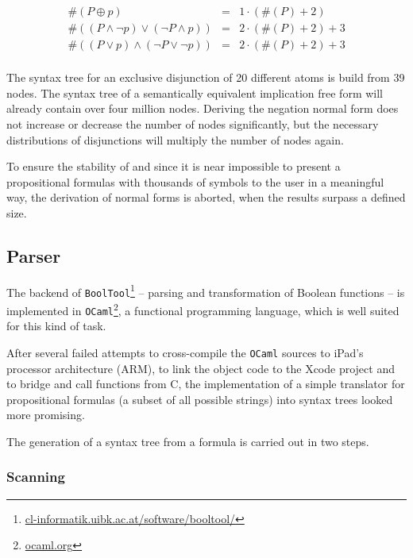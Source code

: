 \begin{eqnarray*}
\#(P \oplus p) & = & 1 \cdot(\#(P) + 2) \\
\#((P \wedge \neg p) \vee  (\neg P \wedge p)) & = & 2 \cdot (\#(P) + 2) + 3 \\
\#((P \vee p) \wedge  (\neg P \vee \neg p)) & = & 2 \cdot (\#(P) + 2) + 3 \\
\end{eqnarray*}

The syntax tree for an exclusive disjunction of 20 different atoms is build from 39 nodes.
The syntax tree of a semantically equivalent implication free form will already contain over four million nodes.
Deriving the negation normal form does not increase or decrease the number of nodes significantly,
but the necessary distributions of disjunctions will multiply the number of nodes again.

To ensure the stability of \Nyaya 
and since it is near impossible 
to present a propositional formulas with thousands of symbols 
to the user in a meaningful way, 
the derivation of normal forms is aborted, when the results surpass a defined size.



\subsection{Parser}
\label{subsec:Parser}

The backend of \verb+BoolTool+\footnote{
\href{http://cl-informatik.uibk.ac.at/software/booltool/}{cl-informatik.uibk.ac.at/software/booltool/}} 
– parsing and transformation of Boolean functions – 
is implemented in \verb+OCaml+\footnote{
\href{http://ocaml.org}{ocaml.org}}, 
a functional programming language, which is well suited for this kind of task.

After several failed attempts to cross-compile the \verb+OCaml+ sources to iPad's processor architecture (ARM),
to link the object code to the Xcode project and to bridge and call functions from C, 
the implementation of a simple translator 
for propositional formulas (a subset of all possible strings)
into syntax trees looked more promising. 

The generation of a syntax tree from a formula  is carried out in two steps. 

\subsubsection{Scanning}

